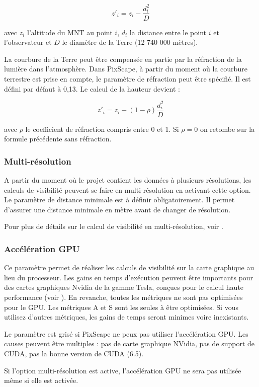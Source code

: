 \documentclass{report}
\begin{document}
$$z'_i = z_i - \frac{d_i^2}{D}$$

avec $z_i$ l'altitude du MNT au point $i$, $d_i$ la distance entre le point $i$ et l'observateur et $D$ le diamètre de la Terre (12 740 000 mètres).

La courbure de la Terre peut être compensée en partie par la réfraction de la lumière dans l'atmosphère. Dans PixScape, à partir du moment où la courbure terrestre est prise en compte, le paramètre de réfraction peut être spécifié. Il est défini par défaut à 0,13. Le calcul de la hauteur devient : 

$$z'_i = z_i - (1-\rho)\frac{d_i^2}{D}$$

avec $\rho$ le coefficient de réfraction compris entre 0 et 1. Si $\rho=0$ on retombe sur la formule précédente sans réfraction.


\subsubsection{Multi-résolution}
A partir du moment où le projet contient les données à plusieurs résolutions, les calculs de visibilité peuvent se faire en multi-résolution en activant cette option. Le paramètre de distance minimale est à définir obligatoirement. Il permet d'assurer une distance minimale en mètre avant de changer de résolution. 

Pour plus de détails sur le calcul de visibilité en multi-résolution, voir .


\subsubsection{Accélération GPU}
Ce paramètre permet de réaliser les calculs de visibilité sur la carte graphique au lieu du processeur. Les gains en temps d'exécution peuvent être importants pour des cartes graphiques Nvidia de la gamme Tesla, conçues pour le calcul haute performance (voir ). En revanche, toutes les métriques ne sont pas optimisées pour le GPU. Les métriques A et S sont les seules à être optimisées. Si vous utilisez d'autres métriques, les gains de temps seront minimes voire inexistants.

Le paramètre est grisé si PixScape ne peux pas utiliser l'accélération GPU. Les causes peuvent être multiples : pas de carte graphique NVidia, pas de support de CUDA, pas la bonne version de CUDA (6.5).

Si l'option multi-résolution est active, l'accélération GPU ne sera pas utilisée même si elle est activée.
\end{document}
